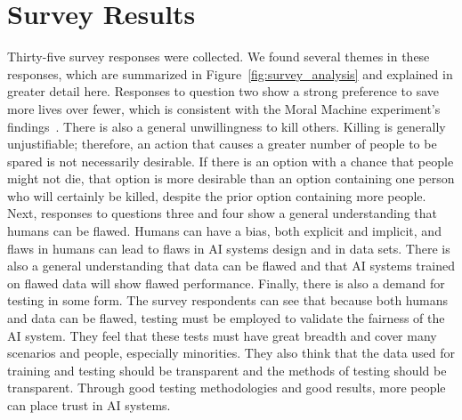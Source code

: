 \documentclass[paper=a4paper]{report}
\begin{document}
\FloatBarrier
\section{Survey Results}

Thirty-five survey responses were collected. We found several themes in these responses, which are
summarized in Figure~\ref{fig:survey_analysis} and explained in greater detail here. Responses to
question two show a strong preference to save more lives over fewer, which is consistent with the
Moral Machine experiment's findings~\cite{awad2018moral}. There is also a general unwillingness to
kill others. Killing is generally unjustifiable; therefore, an action that causes a greater number
of people to be spared is not necessarily desirable. If there is an option with a chance that people
might not die, that option is more desirable than an option containing one person who will certainly
be killed, despite the prior option containing more people. Next, responses to questions three and
four show a general understanding that humans can be flawed. Humans can have a bias, both explicit
and implicit, and flaws in humans can lead to flaws in AI systems design and in data sets. There is
also a general understanding that data can be flawed and that AI systems trained on flawed data will
show flawed performance. Finally, there is also a demand for testing in some form. The survey
respondents can see that because both humans and data can be flawed, testing must be employed to
validate the fairness of the AI system. They feel that these tests must have great breadth and cover
many scenarios and people, especially minorities. They also think that the data used for training
and testing should be transparent and the methods of testing should be transparent. Through good
testing methodologies and good results, more people can place trust in AI systems.
\end{document}
